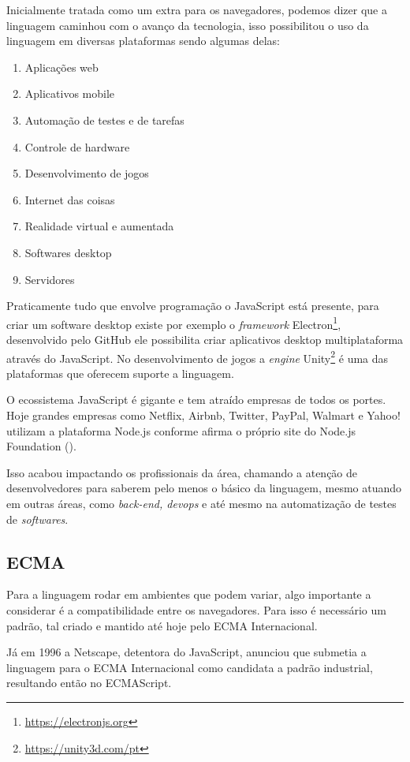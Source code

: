 \documentclass[
	12pt,				%
	openright,			%
	twoside,			%
	a4paper,			%
	english,			%
	brazil				%
	]{abntex2}
\begin{document}
Inicialmente tratada como um extra para os navegadores, podemos dizer que a linguagem caminhou com o avanço da tecnologia, isso possibilitou o uso da linguagem em diversas plataformas sendo algumas delas:

\begin{enumerate}[label=\alph*)]
\item Aplicações web
\item Aplicativos mobile 
\item Automação de testes e de tarefas
\item Controle de hardware
\item Desenvolvimento de jogos
\item Internet das coisas
\item Realidade virtual e aumentada
\item Softwares desktop
\item Servidores 
\end{enumerate}

Praticamente tudo que envolve programação o JavaScript está presente, para criar um software desktop existe por exemplo o \textit{framework} Electron\footnote{\url{https://electronjs.org}}, desenvolvido pelo GitHub ele possibilita criar aplicativos desktop multiplataforma através do JavaScript. No desenvolvimento de jogos a \textit{engine} Unity\footnote{\url{https://unity3d.com/pt}} é uma das plataformas que oferecem suporte a linguagem.

O ecossistema JavaScript é gigante e tem atraído empresas de todos os portes. Hoje grandes empresas como Netflix, Airbnb, Twitter, PayPal, Walmart e Yahoo! utilizam a plataforma Node.js conforme afirma o próprio site do Node.js Foundation (\citeauthor{node_foundation}).

Isso acabou impactando os profissionais da área, chamando a atenção de desenvolvedores para saberem pelo menos o básico da linguagem, mesmo atuando em outras áreas, como \textit{back-end, devops} e até mesmo na automatização de testes de \textit{softwares}.

\subsection{ECMA}

Para a linguagem rodar em ambientes que podem variar, algo importante a considerar é a compatibilidade entre os navegadores. Para isso é necessário um padrão, tal criado e mantido até hoje pelo ECMA Internacional. 

Já em 1996 a Netscape, detentora do JavaScript, anunciou que submetia a linguagem para o ECMA Internacional como candidata a padrão industrial, resultando então no ECMAScript.
\end{document}
